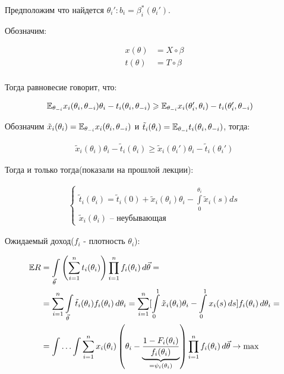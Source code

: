 \begin{exmpl}
Предположим что найдется $\theta_i' \colon b_i = \beta_i^*(\theta_i')$.

Обозначим:

\begin{align*}
	x(\theta) &= X \circ \beta \\
	t(\theta) &= T \circ \beta \\
\end{align*}

Тогда равновесие говорит, что:

\begin{align*}
	\mathbb E_{\theta_{-i}} x_i(\theta_i, \theta_{-i}) \theta_i - t_i(\theta_i, \theta_{-i}) &\geqslant \mathbb E_{\theta_{-i}} x_i(\theta_i', \theta_i) - t_i(\theta_i', \theta_{-i})
\end{align*}

Обозначим $\tilde x_i(\theta_i) = \mathbb E_{\theta_{-i}} x_i(\theta_i, \theta_{-i})$ и  $\tilde t_i(\theta_i) = \mathbb E_{\theta_{-i}} t_i(\theta_i, \theta_{-i})$, тогда:

 \begin{align*}
	\tilde x_i(\theta_i) \theta_i - \tilde t_i(\theta_i) \geqslant \tilde x_i(\theta_i') \theta_i - \tilde t_i(\theta_i')
\end{align*}

Тогда и только тогда(показали на прошлой лекции):

\begin{align*}
	\begin{cases}
		\tilde t_i (\theta_i) = \tilde t_i(0) + \tilde x_i(\theta_i) \theta_i - \int\limits_{0}^{\theta_i} \tilde x_i(s) ds \\
		\tilde x_i(\theta_i) \text{~-- неубывающая} 
	\end{cases}
\end{align*}

Ожидаемый доход($f_i$ - плотность  $\theta_i$):

\begin{align*}
	\mathbb E R &= \int\limits_{\vec \theta} \left(\sum_{i = 1}^{n} t_i (\theta_i)\right) \prod_{i = 1}^{n} f_i(\theta_i) \, d \vec \theta =  \\
		 &= \sum_{i = 1}^{n} \int\limits_{\vec \theta} \tilde t_i(\theta_i) f_i(\theta_i) \, d \theta_i = \sum_{i = 1}^{n} [\int\limits_{0}^{1} \tilde x_i(\theta_i) \theta_i - \int\limits_{0}^{1} x_i(s) \, ds] f_i(\theta_i) \, d \theta_i = \\
		 &= \int \dots \int \sum_{i = 1}^{n} x_i(\theta_i) \left(\theta_i - \underbrace{\frac{1 - F_i(\theta_i)}{f_i(\theta_i)}}_{=\psi_i(\theta_i)}\right) \prod_{i = 1}^{n} f_i(\theta_i) \, d \vec \theta \to \max
\end{align*}


\end{exmpl}
